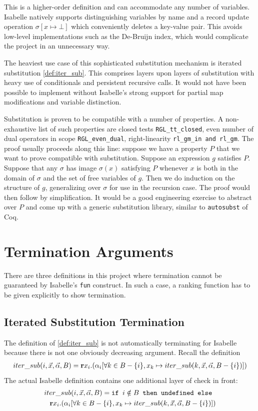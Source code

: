 This is a higher-order definition and can accommodate any number of variables. Isabelle natively supports distinguishing variables by name and a record update operation $\sigma[x\mapsto \bot]$ which conveniently deletes a key-value pair. This avoids low-level implementations such as the De-Bruijn index, which would complicate the project in an unnecessary way.

The heaviest use case of this sophisticated substitution mechanism is iterated substitution \autoref{def:iter_sub}. This comprises layers upon layers of substitution with heavy use of conditionals and persistent recursive calls. It would not have been possible to implement without Isabelle's strong support for partial map modifications and variable distinction.

Substitution is proven to be compatible with a number of properties. A non-exhaustive list of such properties are closed tests \texttt{RGL\_tt\_closed}, even number of dual operators in scope \texttt{RGL\_even\_dual}, right-linearity \texttt{rl\_gm\_in and rl\_gm}. The proof usually proceeds along this line: suppose we have a property $P$ that we want to prove compatible with substitution. Suppose an \RGL{} expression $g$ satisfies $P$. Suppose that any $\sigma$ has image $\sigma(x)$ satisfying $P$ whenever $x$ is both in the domain of $\sigma$ and the set of free variables of $g$. Then we do induction on the structure of $g$, generalizing over $\sigma$ for use in the recursion case. The proof would then follow by simplification. It would be a good engineering exercise to abstract over $P$ and come up with a generic substitution library, similar to \texttt{autosubst} of Coq.

\section{Termination Arguments}
There are three definitions in this project where termination cannot be guaranteed by Isabelle's \texttt{fun} construct. In such a case, a ranking function has to be given explicitly to show termination. 

\subsection{Iterated Substitution Termination}
The definition of \autoref{def:iter_sub} is not automatically terminating for Isabelle because there is not one obviously decreasing argument. Recall the definition
\begin{align}
    iter\_sub(i,\vec{x},\vec{\alpha},B)
    = \textbf{r} x_i. (\alpha_i[\forall k\in B-\{i\}, x_k\mapsto iter\_sub(k,\vec{x}, \vec{\alpha},B-\{i\})])
\end{align}
The actual Isabelle definition contains one additional layer of check in front:
\begin{align}
    iter\_sub(i,\vec{x},\vec{\alpha},B)
    = \texttt{if } i\notin B \texttt{ then undefined else }
    \\
    \textbf{r} x_i. (\alpha_i[\forall k\in B-\{i\}, x_k\mapsto iter\_sub(k,\vec{x}, \vec{\alpha},B-\{i\})])
\end{align}

